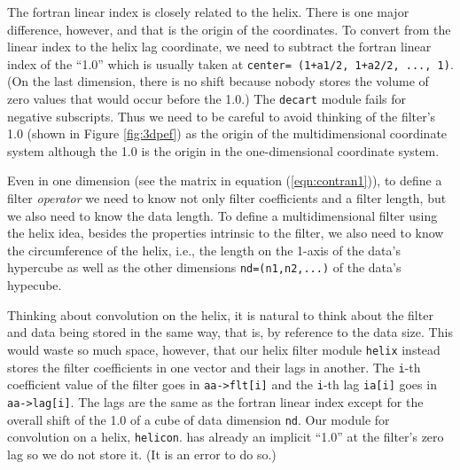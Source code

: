 \par
The fortran linear index is closely related to the helix.
There is one major difference, however,
and that is the origin of the coordinates.
To convert from the linear index
to the helix lag coordinate,
we need to subtract the fortran linear index of the ``1.0''
which is usually taken at
\texttt{center= (1+a1/2, 1+a2/2, ..., 1)}.
(On the last dimension, there is no shift because nobody stores the
volume of zero values that would occur before the 1.0.)
The \texttt{decart} module fails for negative subscripts.
Thus we need to be careful to avoid thinking of the filter's 1.0 
(shown in Figure \ref{fig:3dpef})
as the origin of the multidimensional coordinate system
although the 1.0 is the origin in the one-dimensional coordinate system.

\par
Even in one dimension
(see the matrix in equation (\ref{eqn:contran1})),
to define a filter {\it operator} we need to know
not only filter coefficients and a filter length,
but we also need to know the data length.
To define a multidimensional filter using the helix idea,
besides the properties intrinsic to the filter,
we also need to know the circumference of the helix,
i.e., the length on the 1-axis of the data's hypercube
as well as the other dimensions
\texttt{nd=(n1,n2,...)}
of the data's hypecube.

\par
Thinking about convolution on the helix,
it is natural to think about the filter and data being stored
in the same way, that is, by reference to the data size.
This would waste so much space, however,
that our helix filter module
\texttt{helix} 
instead stores the filter coefficients in one vector
and their lags in another.
The \texttt{i}-th coefficient value
of the filter goes in  \verb#aa->flt[i]# and
the \texttt{i}-th lag \texttt{ia[i]} goes in \verb#aa->lag[i]#.
The lags are the same as the fortran linear index
except for the overall shift of the 1.0 of a cube of 
data dimension \texttt{nd}.
Our module for convolution on a helix,
\texttt{helicon}. %
has already an implicit
``1.0'' at the filter's zero lag so we do not store it.
(It is an error to do so.)

